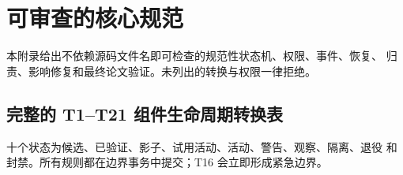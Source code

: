 \section{可审查的核心规范}\label{sec:appendix:specification}

本附录给出不依赖源码文件名即可检查的规范性状态机、权限、事件、恢复、
归责、影响修复和最终论文验证。未列出的转换与权限一律拒绝。

\subsection{完整的 T1--T21 组件生命周期转换表}\label{sec:appendix:transitions}

十个状态为候选、已验证、影子、试用活动、活动、警告、观察、隔离、退役
和封禁。所有规则都在边界事务中提交；T16 会立即形成紧急边界。

